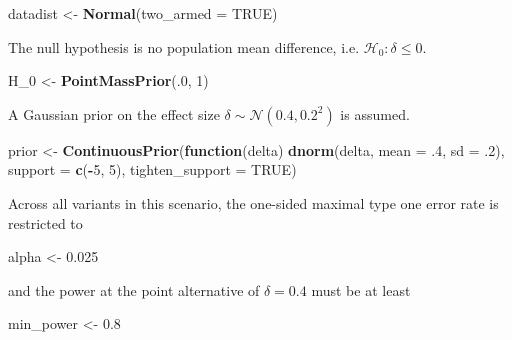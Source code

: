\documentclass[]{book}
\newenvironment{Shaded}{\begin{snugshade}}{\end{snugshade}}
\newcommand{\ControlFlowTok}[1]{\textcolor[rgb]{0.13,0.29,0.53}{\textbf{#1}}}
\newcommand{\DataTypeTok}[1]{\textcolor[rgb]{0.13,0.29,0.53}{#1}}
\newcommand{\DecValTok}[1]{\textcolor[rgb]{0.00,0.00,0.81}{#1}}
\newcommand{\FloatTok}[1]{\textcolor[rgb]{0.00,0.00,0.81}{#1}}
\newcommand{\KeywordTok}[1]{\textcolor[rgb]{0.13,0.29,0.53}{\textbf{#1}}}
\newcommand{\NormalTok}[1]{#1}
\newcommand{\OperatorTok}[1]{\textcolor[rgb]{0.81,0.36,0.00}{\textbf{#1}}}
\newcommand{\OtherTok}[1]{\textcolor[rgb]{0.56,0.35,0.01}{#1}}
\newcommand{\StringTok}[1]{\textcolor[rgb]{0.31,0.60,0.02}{#1}}
\begin{document}
\begin{Shaded}
\begin{Highlighting}[]
\NormalTok{datadist <-}\StringTok{ }\KeywordTok{Normal}\NormalTok{(}\DataTypeTok{two_armed =} \OtherTok{TRUE}\NormalTok{)}
\end{Highlighting}
\end{Shaded}

The null hypothesis is no population mean difference, i.e.
\(\mathcal{H}_0:\delta \leq 0\).

\begin{Shaded}
\begin{Highlighting}[]
\NormalTok{H_}\DecValTok{0}\NormalTok{ <-}\StringTok{ }\KeywordTok{PointMassPrior}\NormalTok{(.}\DecValTok{0}\NormalTok{, }\DecValTok{1}\NormalTok{)}
\end{Highlighting}
\end{Shaded}

A Gaussian prior on the effect size
\(\delta \sim \mathcal{N} ( 0.4, 0.2^2)\) is assumed.

\begin{Shaded}
\begin{Highlighting}[]
\NormalTok{prior <-}\StringTok{ }\KeywordTok{ContinuousPrior}\NormalTok{(}\ControlFlowTok{function}\NormalTok{(delta) }\KeywordTok{dnorm}\NormalTok{(delta, }\DataTypeTok{mean =} \FloatTok{.4}\NormalTok{, }\DataTypeTok{sd =} \FloatTok{.2}\NormalTok{),}
                         \DataTypeTok{support =} \KeywordTok{c}\NormalTok{(}\OperatorTok{-}\DecValTok{5}\NormalTok{, }\DecValTok{5}\NormalTok{),}
                         \DataTypeTok{tighten_support =} \OtherTok{TRUE}\NormalTok{)}
\end{Highlighting}
\end{Shaded}

Across all variants in this scenario, the one-sided maximal
type one error rate is restricted to

\begin{Shaded}
\begin{Highlighting}[]
\NormalTok{alpha <-}\StringTok{ }\FloatTok{0.025}
\end{Highlighting}
\end{Shaded}

and the power at the point alternative of \(\delta=0.4\) must
be at least

\begin{Shaded}
\begin{Highlighting}[]
\NormalTok{min_power <-}\StringTok{ }\FloatTok{0.8}
\end{Highlighting}
\end{Shaded}
\end{document}
